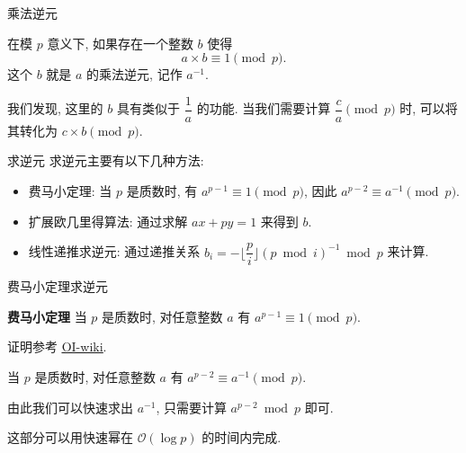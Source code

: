 \documentclass[aspectratio=169]{beamer}  %
\newcommand{\pau}{\pause}
\begin{document}
\begin{frame}{乘法逆元}
  \begin{definition}
    在模 $p$ 意义下, 如果存在一个整数 $b$ 使得
    $$a \times b \equiv 1 \pmod{p} \text{.}$$
    这个 $b$ 就是 $a$ 的乘法逆元, 记作 $a^{-1}$.
  \end{definition}\pau

  \vspace{1em}

  我们发现, 这里的 $b$ 具有类似于 $\dfrac{1}{a}$ 的功能. 
  当我们需要计算 $\displaystyle \dfrac{c}{a} \pmod{p}$ 时, 可以将其转化为 $c \times b \pmod{p}$.
\end{frame}

\begin{frame}{求逆元}
  求逆元主要有以下几种方法:\pau
  \begin{itemize}
    \item 费马小定理: 当 $p$ 是质数时, 有 $a^{p-1} \equiv 1 \pmod{p}$, 因此 $a^{p-2} \equiv a^{-1} \pmod{p}$.\pau
    \item 扩展欧几里得算法: 通过求解 $ax + py = 1$ 来得到 $b$.\pau
    \item 线性递推求逆元: 通过递推关系 $b_i = -\lfloor \dfrac{p}{i} \rfloor (p \bmod i)^{-1} \bmod{p}$ 来计算.
  \end{itemize}
\end{frame}
  
\begin{frame}{费马小定理求逆元}
  \begin{theorem}{\textbf{费马小定理}}
    当 $p$ 是质数时, 对任意整数 $a$ 有 $a^{p-1} \equiv 1 \pmod{p}$.
  \end{theorem}

  证明参考 \href{https://oi-wiki.org/math/number-theory/inverse}{\color{magenta}\underline{OI-wiki}}.\pau

  \begin{corollary}
    当 $p$ 是质数时, 对任意整数 $a$ 有 $a^{p-2} \equiv a^{-1} \pmod{p}$.
  \end{corollary}\pau

  由此我们可以快速求出 $a^{-1}$, 只需要计算 $a^{p-2} \bmod p$ 即可.

  \vspace{1em}

  这部分可以用快速幂在 $\mathcal{O}(\log p)$ 的时间内完成.
\end{frame}
  
\end{document}
